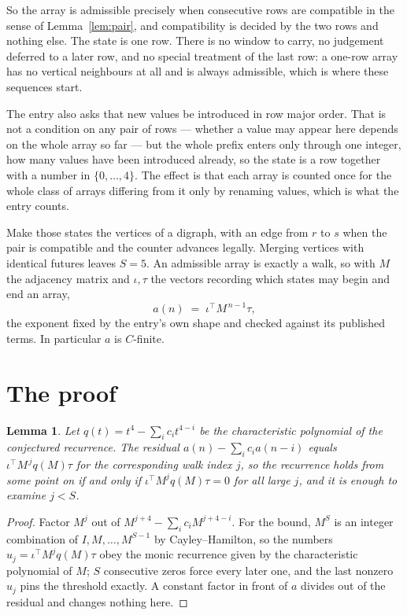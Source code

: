 \documentclass[11pt,a4paper]{article}
\theoremstyle{plain}
\newtheorem{lemma}[theorem]{Lemma}
\theoremstyle{definition}
\begin{document}
So the array is admissible precisely when consecutive rows are compatible in the sense of Lemma~\ref{lem:pair}, and compatibility is decided by the two rows and nothing else. The state is one row. There is no window to carry, no judgement deferred to a later row, and no special treatment of the last row: a one-row array has no vertical neighbours at all and is always admissible, which is where these sequences start.

The entry also asks that new values be introduced in row major order. That is not a condition on any pair of rows --- whether a value may appear here depends on the whole array so far --- but the whole prefix enters only through one integer, how many values have been introduced already, so the state is a row together with a number in $\{0,\dots,4\}$. The effect is that each array is counted once for the whole class of arrays differing from it only by renaming values, which is what the entry counts.

Make those states the vertices of a digraph, with an edge from $r$ to $s$ when the pair is compatible and the counter advances legally. Merging vertices with identical futures leaves $S=5$. An admissible array is exactly a walk, so with $M$ the adjacency matrix and $\iota,\tau$ the vectors recording which states may begin and end an array,
\[
a(n)\;=\;\iota^{\!\top}M^{\,n-1}\tau ,
\]
the exponent fixed by the entry's own shape and checked against its published terms. In
particular $a$ is $C$-finite.

\section{The proof}

\begin{lemma}\label{lem:crit}
Let $q(t)=t^{4}-\sum_i c_it^{4-i}$ be the characteristic polynomial of the
conjectured recurrence. The residual $a(n)-\sum_ic_ia(n-i)$ equals
$\iota^{\!\top}M^{\,j}q(M)\tau$ for the corresponding walk index $j$, so the recurrence
holds from some point on if and only if $\iota^{\!\top}M^{j}q(M)\tau=0$ for all large $j$,
and it is enough to examine $j<S$.
\end{lemma}

\begin{proof}
Factor $M^{j}$ out of $M^{j+4}-\sum_ic_iM^{j+4-i}$. For the bound, $M^{S}$
is an integer combination of $I,M,\dots,M^{S-1}$ by Cayley--Hamilton, so the numbers
$u_j=\iota^{\!\top}M^{j}q(M)\tau$ obey the monic recurrence given by the characteristic
polynomial of $M$; $S$ consecutive zeros force every later one, and the last nonzero $u_j$
pins the threshold exactly. A constant factor in front of $a$ divides out of the residual and
changes nothing here.
\end{proof}
\end{document}
